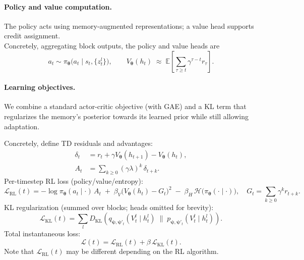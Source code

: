 \vspace{0.75ex}
\paragraph{Policy and value computation.}
The policy acts using memory-augmented representations; a value head supports credit assignment.
\\
Concretely, aggregating block outputs, the policy and value heads are
\begin{equation}
a_t \sim \pi_{\boldsymbol{\theta}}\!\big(a_t \mid s_t,\{z_t^l\}\big),
\qquad
V_{\boldsymbol{\theta}}(h_t) \;\approx\; \mathbb{E}\!\left[\sum_{\tau\ge t}\gamma^{\tau-t} r_\tau\right].
\end{equation}

\vspace{0.75ex}
\paragraph{Learning objectives.}
We combine a standard actor-critic objective (with GAE) and a KL term that regularizes the memory's posterior towards its learned prior while still allowing adaptation.

Concretely, define TD residuals and advantages:
\begin{align}
\delta_t &= r_t + \gamma V_{\boldsymbol{\theta}}(h_{t+1}) - V_{\boldsymbol{\theta}}(h_t),\\
A_t &= \sum_{k\ge 0} (\gamma\lambda)^k \,\delta_{t+k}.
\end{align}
Per-timestep RL loss (policy/value/entropy):
\begin{equation}
\mathcal{L}_{\mathrm{RL}}(t)
=
-\log \pi_{\boldsymbol{\theta}}(a_t\mid\cdot)\,A_t
\;+\;
\beta_V \big(V_{\boldsymbol{\theta}}(h_t) - G_t\big)^2
\;-\;
\beta_H\,\mathcal{H}\!\big(\pi_{\boldsymbol{\theta}}(\cdot\mid\cdot)\big),
\quad
G_t=\sum_{k\ge 0}\gamma^k r_{t+k}.
\end{equation}
KL regularization (summed over blocks; heads omitted for brevity):
\begin{equation}
\mathcal{L}_{\mathrm{KL}}(t)
=
\sum_{l}
D_{\mathrm{KL}}\!\left(
q_{\boldsymbol{\psi},\boldsymbol{\psi}'_t}(V_t^l\mid h_t^l)
\;\Big\|\;
p_{\boldsymbol{\psi},\boldsymbol{\psi}'_t}(V_t^l\mid h_t^l)
\right).
\end{equation}
Total instantaneous loss:
\begin{equation}
\mathcal{L}(t)
=
\mathcal{L}_{\mathrm{RL}}(t)
+
\beta\,\mathcal{L}_{\mathrm{KL}}(t).
\end{equation}
Note that \(\mathcal{L}_{\mathrm{RL}}(t)\) may be different depending on the RL algorithm.

